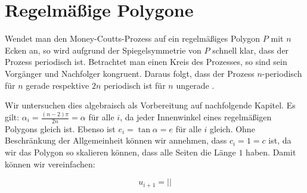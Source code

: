 \chapter{Regelmäßige Polygone}
\label{regular-polygon:chapter}

Wendet man den Money-Coutts-Prozess auf ein regelmäßiges Polygon $P$ mit $n$ Ecken an, so wird aufgrund der Spiegelsymmetrie von $P$ schnell klar,
dass der Prozess periodisch ist.
Betrachtet man einen Kreis des Prozesses, so sind sein Vorgänger und Nachfolger kongruent.
Daraus folgt, dass der Prozess $n$-periodisch für $n$ gerade respektive $2n$ periodisch ist für $n$ ungerade \citep{Taba2000}.

Wir untersuchen dies algebraisch als Vorbereitung auf nachfolgende Kapitel.
Es gilt: $\alpha_i = \frac{(n-2) \pi}{2n} = \alpha$ für alle $i$, da jeder Innenwinkel eines regelmäßigen Polygons gleich ist.
Ebenso ist $e_i=\tan \alpha = e$ für alle $i$ gleich.
Ohne Beschränkung der Allgemeinheit können wir annehmen, dass $c_i=1 = c$ ist,
da wir das Polygon so skalieren können, dass alle Seiten die Länge $1$ haben.
Damit können wir  vereinfachen:

\begin{equation}
    u_{i+1}=||
\end{equation}

